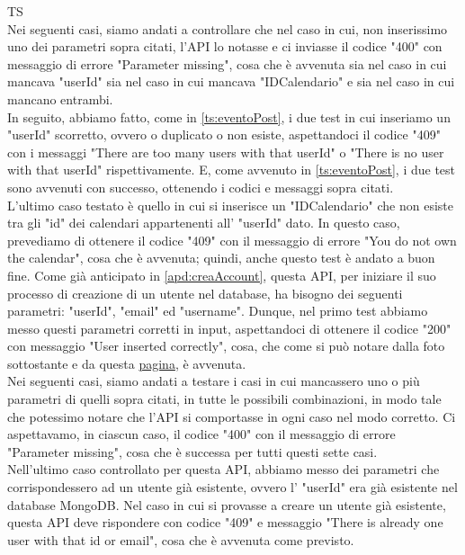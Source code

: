 \begin{listaPersonale}{TS}
                \\
                Nei seguenti casi, siamo andati a controllare che nel caso in cui, non inserissimo uno dei parametri sopra citati, l'API lo notasse e ci inviasse il codice "400" con messaggio di errore "Parameter missing", cosa che è avvenuta sia nel caso in cui mancava "userId" sia nel caso in cui mancava "IDCalendario" e sia nel caso in cui mancano entrambi.
                 \\
                In seguito, abbiamo fatto, come in \ref{ts:eventoPost}, i due test in cui inseriamo un "userId" scorretto, ovvero o duplicato o non esiste, aspettandoci il codice "409" con i messaggi "There are too many users with that userId" o "There is no user with that userId" rispettivamente. E, come avvenuto in \ref{ts:eventoPost}, i due test sono avvenuti con successo, ottenendo i codici e messaggi sopra citati.
                 \\
                L'ultimo caso testato è quello in cui si inserisce un "IDCalendario" che non esiste tra gli "id" dei calendari appartenenti all' "userId" dato. In questo caso, prevediamo di ottenere il codice "409" con il messaggio di errore "You do not own the calendar", cosa che è avvenuta; quindi, anche questo test è andato a buon fine.
                Come già anticipato in \ref{apd:creaAccount}, questa API, per iniziare il suo processo di creazione di un utente nel database, ha bisogno dei seguenti parametri: "userId", "email" ed "username". Dunque, nel primo test abbiamo messo questi parametri corretti in input, aspettandoci di ottenere il codice "200" con messaggio "User inserted correctly", cosa, che come si può notare dalla foto sottostante e da questa \href{https://plan-it.it/test-report.html} {pagina}, è avvenuta.
                 \\
                Nei seguenti casi, siamo andati a testare i casi in cui mancassero uno o più parametri di quelli sopra citati, in tutte le possibili combinazioni, in modo tale che potessimo notare che l'API si comportasse in ogni caso nel modo corretto. Ci aspettavamo, in ciascun caso, il codice "400" con il messaggio di errore "Parameter missing", cosa che è successa per tutti questi sette casi.
                 \\
                Nell'ultimo caso controllato per questa API, abbiamo messo dei parametri che corrispondessero ad un utente già esistente, ovvero l' "userId" era già esistente nel database MongoDB. Nel caso in cui si provasse a creare un utente già esistente, questa API deve rispondere con codice "409" e messaggio "There is already one user with that id or email", cosa che è avvenuta come previsto.

\end{listaPersonale}
